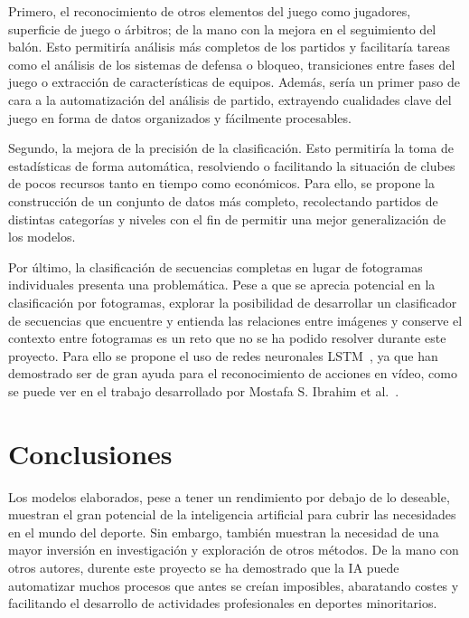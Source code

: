 \documentclass[12pt]{report} %
\begin{document}
    Primero, el reconocimiento de otros elementos del juego como jugadores,
    superficie de juego o árbitros; de la mano con la mejora en el seguimiento
    del balón. Esto permitiría análisis más completos de los partidos y
    facilitaría tareas como el análisis de los sistemas de defensa o bloqueo,
    transiciones entre fases del juego o extracción de características de
    equipos. Además, sería un primer paso de cara a la automatización del
    análisis de partido, extrayendo cualidades clave del juego en forma de
    datos organizados y fácilmente procesables.

    Segundo, la mejora de la precisión de la clasificación. Esto permitiría la
    toma de estadísticas de forma automática, resolviendo o facilitando la
    situación de clubes de pocos recursos tanto en tiempo como económicos. Para
    ello, se propone la construcción de un conjunto de datos más completo,
    recolectando partidos de distintas categorías y niveles con el fin de
    permitir una mejor generalización de los modelos.

    Por último, la clasificación de secuencias completas en lugar de fotogramas
    individuales presenta una problemática. Pese a que se aprecia potencial en
    la clasificación por fotogramas, explorar la posibilidad de desarrollar un
    clasificador de secuencias que encuentre y entienda las relaciones entre
    imágenes y conserve el contexto entre fotogramas es un reto que no se ha
    podido resolver durante este proyecto. Para ello se propone el uso de redes
    neuronales LSTM~\cite{Hochreiter1997LongSM}, ya que han demostrado ser de
    gran ayuda para el reconocimiento de acciones en vídeo, como se puede ver
    en el trabajo desarrollado por Mostafa S. Ibrahim et
    al.~\cite{Ibrahim_2016_CVPR}.
    

    \chapter{Conclusiones}
    \label{chap:conclusion}

    Los modelos elaborados, pese a tener un rendimiento por debajo de lo
    deseable, muestran el gran potencial de la inteligencia artificial para
    cubrir las necesidades en el mundo del deporte. Sin embargo, también
    muestran la necesidad de una mayor inversión en investigación y exploración
    de otros métodos. De la mano con otros autores, durente este proyecto se ha
    demostrado que la IA puede automatizar muchos procesos que antes se creían
    imposibles, abaratando costes y facilitando el desarrollo de actividades
    profesionales en deportes minoritarios. 
\end{document}
